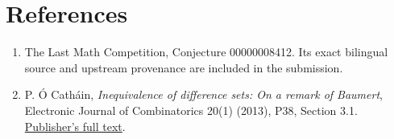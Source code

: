 \documentclass[11pt]{article}
\begin{document}
\section*{References}
\begin{enumerate}
\item The Last Math Competition, Conjecture 00000008412. Its exact
bilingual source and upstream provenance are included in the submission.
\item P. \'{O} Cath\'{a}in, \emph{Inequivalence of difference sets:
On a remark of Baumert}, Electronic Journal of Combinatorics
20(1) (2013), P38, Section 3.1.
\href{https://www.combinatorics.org/ojs/index.php/eljc/article/download/v20i1p38/pdf/}{Publisher's full text}.
\end{enumerate}
\end{document}
